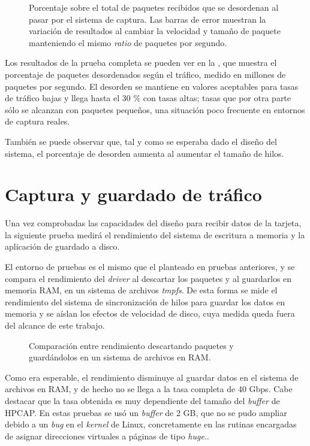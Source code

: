 \documentclass[oneside, draft]{epstfg}
\begin{document}
\begin{figure}[hbtp]
\caption[Desorden de paquetes inducido por el sistema de captura]{Porcentaje sobre el total de paquetes recibidos que se desordenan al pasar por el sistema de captura. Las barras de error muestran la variación de resultados al cambiar la velocidad y tamaño de paquete manteniendo el mismo \textit{ratio} de paquetes por segundo.}
\label{fig:Validacion:Ordering}
\end{figure}

Los resultados de la prueba completa se pueden ver en la , que muestra el porcentaje de paquetes desordenados según el tráfico, medido en millones de paquetes por segundo. El desorden se mantiene en valores aceptables para tasas de tráfico bajas y llega hasta el 30 \% con tasas altas; tasas que por otra parte sólo se alcanzan con paquetes pequeños, una situación poco frecuente en entornos de captura reales.

También se puede observar que, tal y como se esperaba dado el diseño del sistema, el porcentaje de desorden aumenta al aumentar el tamaño de hilos.

\section{Captura y guardado de tráfico}

Una vez comprobadas las capacidades del diseño para recibir datos de la tarjeta, la siguiente prueba medirá el rendimiento del sistema de escritura a memoria y la aplicación de guardado a disco.

El entorno de pruebas es el mismo que el planteado en pruebas anteriores, y se compara el rendimiento del \textit{driver} al descartar los paquetes y al guardarlos en memoria RAM, en un sistema de archivos \textit{tmpfs}. De esta forma se mide el rendimiento del sistema de sincronización de hilos para guardar los datos en memoria y se aíslan los efectos de velocidad de disco, cuya medida queda fuera del alcance de este trabajo.

\begin{figure}[hbtp]
\caption{Comparación entre rendimiento descartando paquetes y guardándolos en un sistema de archivos en RAM.}
\label{fig:Validacion:DiskStore}
\end{figure}

Como era esperable, el rendimiento disminuye al guardar datos en el sistema de archivos en RAM, y de hecho no se llega a la tasa completa de 40 Gbps. Cabe destacar que la tasa obtenida es muy dependiente del tamaño del \textit{buffer} de HPCAP. En estas pruebas se usó un \textit{buffer} de 2 GB, que no se pudo ampliar debido a un \textit{bug} en el \textit{kernel} de Linux, concretamente en las rutinas encargadas de asignar direcciones virtuales a páginas de tipo \textit{huge}..
\end{document}
